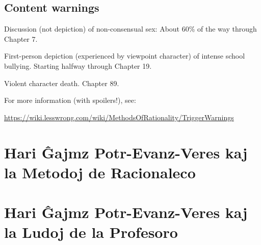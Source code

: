 \RequirePackage[pdf]{layout/hp-book}


{
\pagestyle{empty}



\chapter*{Content warnings}
\thispagestyle{empty}

Discussion (not depiction) of non-consensual sex: About 60\% of the way through Chapter 7.

First-person depiction (experienced by viewpoint character) of intense school bullying. Starting halfway through Chapter 19.

Violent character death. Chapter 89.

For more information (with spoilers!), see:
\begin{center}\url{https://wiki.lesswrong.com/wiki/MethodsOfRationality/TriggerWarnings}\end{center}


\cleartorecto
}
\setcounter{page}{1}


\part{Hari Ĝajmz Potr-Evanz-Veres kaj la Metodoj de Racionaleco}
% 
% 
% 
% 
% 
% 
% 
% 
% 

% 
% 
% 
% 
% 
% 
% 
% 
% 
% 
\part{Hari Ĝajmz Potr-Evanz-Veres kaj la Ludoj de la Profesoro}
% 
% 
% 
% 
% 
% 
% 
% 
% 
% 
% 
% 
% 
% 
% 
% 
